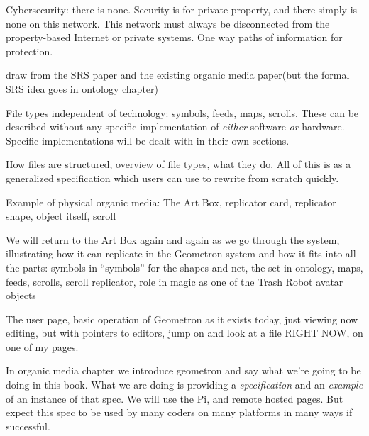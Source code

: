 Cybersecurity: there is none. Security is for private property, and
there simply is none on this network. This network must always be
disconnected from the property-based Internet or private systems. One
way paths of information for protection.

draw from the SRS paper and the existing organic media paper(but the
formal SRS idea goes in ontology chapter)

File types independent of technology: symbols, feeds, maps, scrolls.
These can be described without any specific implementation of
\emph{either} software \emph{or} hardware. Specific implementations will
be dealt with in their own sections.

How files are structured, overview of file types, what they do. All of
this is as a generalized specification which users can use to rewrite
from scratch quickly.

Example of physical organic media: The Art Box, replicator card,
replicator shape, object itself, scroll

We will return to the Art Box again and again as we go through the
system, illustrating how it can replicate in the Geometron system and
how it fits into all the parts: symbols in ``symbols'' for the shapes
and net, the set in ontology, maps, feeds, scrolls, scroll replicator,
role in magic as one of the Trash Robot avatar objects

The user page, basic operation of Geometron as it exists today, just
viewing now editing, but with pointers to editors, jump on and look at a
file RIGHT NOW, on one of my pages.

In organic media chapter we introduce geometron and say what we're going
to be doing in this book. What we are doing is providing a
\emph{specification} and an \emph{example} of an instance of that spec.
We will use the Pi, and remote hosted pages. But expect this spec to be
used by many coders on many platforms in many ways if successful.
